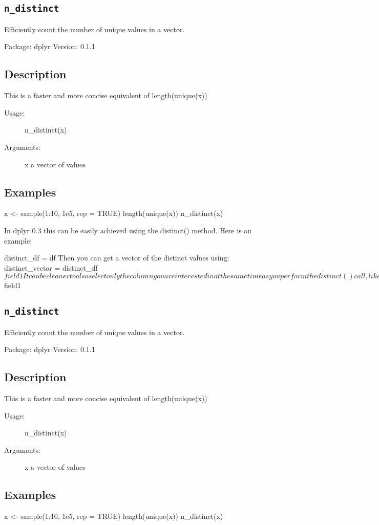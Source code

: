 
\subsection{\texttt{n_distinct}}

Efficiently count the number of unique values in a vector.


Package:  dplyr
Version:  0.1.1

\subsection{Description}
This is a faster and more concise equivalent of length(unique(x))


\begin{description}
\item[Usage:] n_distinct(x)

\item[Arguments:] x a vector of values
\end{description}
\subsection{Examples}

x <- sample(1:10, 1e5, rep = TRUE)
length(unique(x))
n_distinct(x)


In dplyr 0.3 this can be easily achieved using the distinct() method. Here is an example:


distinct_df = df %
Then you can get a vector of the distinct values using: 
distinct_vector = distinct_df$field1

It can be cleaner to also select only the column you are interested in at the same time as you perform the distinct() call, like so:


distinct_df = df %
distinct_vector = distinct_df$field1


\subsection{\texttt{n_distinct}}

Efficiently count the number of unique values in a vector.


Package:  dplyr
Version:  0.1.1

\subsection{Description}
This is a faster and more concise equivalent of length(unique(x))


\begin{description}
\item[Usage:] n_distinct(x)

\item[Arguments:] x a vector of values
\end{description}
\subsection{Examples}

x <- sample(1:10, 1e5, rep = TRUE)
length(unique(x))
n_distinct(x)

